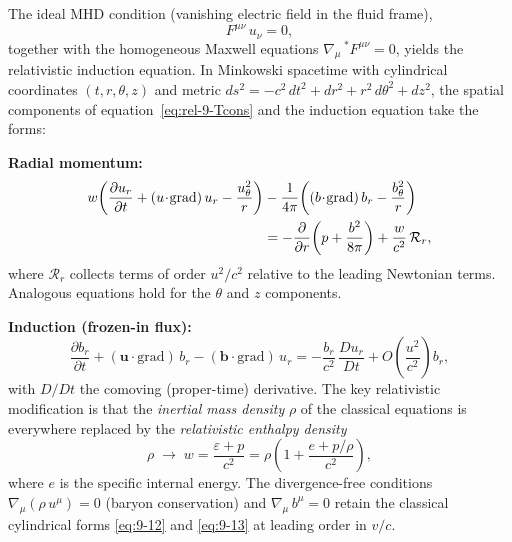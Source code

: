 The ideal MHD condition (vanishing electric field in the fluid frame),
\begin{equation}
  F^{\mu\nu}\,u_{\nu} = 0,
  \label{eq:rel-9-idealMHD}
\end{equation}
together with the homogeneous Maxwell equations
$\nabla_{\mu}\,{}^{\ast}\!F^{\mu\nu}=0$, yields the relativistic
induction equation.  In Minkowski spacetime with cylindrical
coordinates $(t,r,\theta,z)$ and metric
$ds^{2} = -c^{2}\,dt^{2} + dr^{2} + r^{2}\,d\theta^{2} + dz^{2}$,
the spatial components of equation~\eqref{eq:rel-9-Tcons} and the
induction equation take the forms:

\medskip\noindent\textbf{Radial momentum:}
\begin{align}
  w\!\left(\frac{\partial u_{r}}{\partial t}
    + (\mathbf{u}\!\cdot\!\mathrm{grad})\,u_{r}
    - \frac{u_{\theta}^{2}}{r}\right)
  &- \frac{1}{4\pi}\!\left((\mathbf{b}\!\cdot\!\mathrm{grad})\,b_{r}
    - \frac{b_{\theta}^{2}}{r}\right) \notag\\
  &= -\frac{\partial}{\partial r}
      \!\left(p + \frac{b^{2}}{8\pi}\right)
    + \frac{w}{c^{2}}\,\mathcal{R}_{r},
  \label{eq:rel-9-1}
\end{align}
where $\mathcal{R}_{r}$ collects terms of order $u^{2}/c^{2}$
relative to the leading Newtonian terms.  Analogous equations hold for
the $\theta$ and $z$ components.

\medskip\noindent\textbf{Induction (frozen-in flux):}
\begin{equation}
  \frac{\partial b_{r}}{\partial t}
  + (\mathbf{u}\!\cdot\!\mathrm{grad})\,b_{r}
  - (\mathbf{b}\!\cdot\!\mathrm{grad})\,u_{r}
  = -\frac{b_{r}}{c^{2}}\,\frac{Du_{r}}{Dt}
  + O\!\left(\frac{u^{2}}{c^{2}}\right)\!b_{r},
  \label{eq:rel-9-induction-r}
\end{equation}
with $D/Dt$ the comoving (proper-time) derivative.  The key
relativistic modification is that the \emph{inertial mass density}
$\rho$ of the classical equations is everywhere replaced by the
\emph{relativistic enthalpy density}
\begin{equation}
  \rho \;\longrightarrow\; w
  = \frac{\varepsilon + p}{c^{2}}
  = \rho\!\left(1 + \frac{e + p/\rho}{c^{2}}\right),
  \label{eq:rel-9-rho-to-w}
\end{equation}
where $e$ is the specific internal energy.  The divergence-free
conditions
$\nabla_{\mu}(\rho\, u^{\mu})=0$ (baryon conservation) and
$\nabla_{\mu}\,b^{\mu}=0$ retain the classical cylindrical forms
\eqref{eq:9-12} and \eqref{eq:9-13} at leading order in $v/c$.

